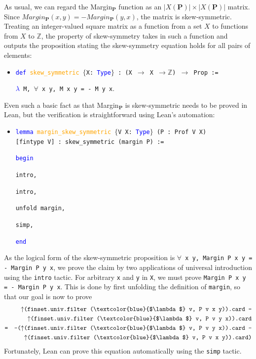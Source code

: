 \documentclass[runningheads]{llncs}
\begin{document}
As usual, we can regard the Margin$_\mathbf{P}$ function as an $|X(\mathbf{P})|\times |X(\mathbf{P})|$ matrix. Since $Margin_\mathbf{P}(x,y)=-Margin_\mathbf{P}(y,x)$, the matrix is skew-symmetric. Treating an integer-valued square matrix as a function from a set $X$ to functions from $X$ to $\mathbb{Z}$, the property of skew-symmetry takes in such a function and outputs the proposition stating the skew-symmetry equation holds for all pairs of elements:
\begin{itemize}
\item[] \texttt{\textcolor{blue}{def} \textcolor{orange}{skew\_symmetric} $\{$X: \textcolor{blue}{Type}$\}$ : (X $\to$ X $\to \mathbb{Z}$) $\to$ Prop :=} 

\texttt{\textcolor{blue}{$\lambda$} M, $\forall$ x y, M x y = - M y x}.
\end{itemize}
Even such a basic fact as that Margin$_\mathbf{P}$ is skew-symmetric needs to be proved in Lean, but the verification is straightforward using Lean's automation:
\begin{itemize}
\item[] \texttt{\textcolor{blue}{lemma} \textcolor{orange}{margin\_skew\_symmetric} $\{$V X: \textcolor{blue}{Type}$\}$ (P : Prof V X)}\\ \texttt{[fintype V] : skew\_symmetric (margin P) :=} 
 
\texttt{\textcolor{blue}{begin}}

\quad \texttt{intro,}

\quad  \texttt{intro,}

\quad \texttt{unfold margin,}

\quad \texttt{simp,}

\texttt{\textcolor{blue}{end}}
\end{itemize}
As the logical form of the skew-symmetric proposition is \texttt{$\forall$ x y, Margin~P~x~y = - Margin P y x}, we prove the claim by two applications of universal introduction using the \texttt{intro} tactic. For arbitrary \texttt{x} and \texttt{y} in \texttt{X}, we must prove \texttt{Margin~P~x~y = - Margin P y x}. This is done by first unfolding the definition of \texttt{margin}, so that our goal is now to prove  
\begin{eqnarray*}
&&\mbox{\texttt{$\uparrow$(finset.univ.filter (\textcolor{blue}{$\lambda$} v, P v x y)).card -}} \\ 
  &&      \mbox{\texttt{$\uparrow$(finset.univ.filter (\textcolor{blue}{$\lambda$} v, P v y x)).card}}\\
  &\texttt{=}& \mbox{\texttt{-($\uparrow$(finset.univ.filter (\textcolor{blue}{$\lambda$} v, P v y x)).card -}} \\ 
    &&      \mbox{\texttt{$\uparrow$(finset.univ.filter (\textcolor{blue}{$\lambda$} v, P v x y)).card)}}
\end{eqnarray*}
Fortunately, Lean can prove this equation automatically using the \texttt{simp} tactic.
\end{document}
